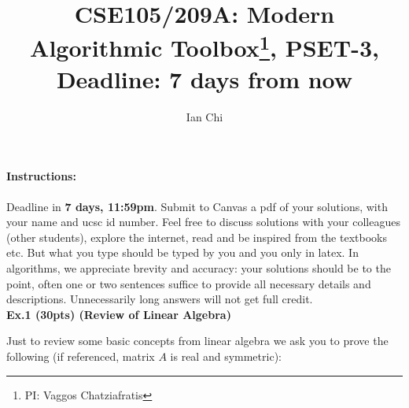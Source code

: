 \documentclass{article}
\title{CSE105/209A: Modern Algorithmic Toolbox\footnote{PI: Vaggos Chatziafratis}, PSET-3,\\ \textbf{Deadline:} \textbf{7 days from now}}
\author{Ian Chi}
\date{}
\begin{document}
\maketitle
\paragraph{Instructions:} Deadline in \textbf{7 days, 11:59pm}. Submit to Canvas a pdf of your solutions, with your name and ucsc id number. Feel free to discuss solutions with your colleagues (other students), explore the internet, read and be inspired from the textbooks etc. But what you type should be typed by you and you only in latex. In algorithms, we appreciate brevity and accuracy: your solutions should be to the point, often one or two sentences suffice to provide all necessary details and descriptions. Unnecessarily long answers will not get full credit.\\




\noindent \textbf{Ex.1 (30pts) (Review of Linear Algebra)}

Just to review some basic concepts from linear algebra we ask you to prove the following (if referenced, matrix $A$ is real and symmetric):
\end{document}
